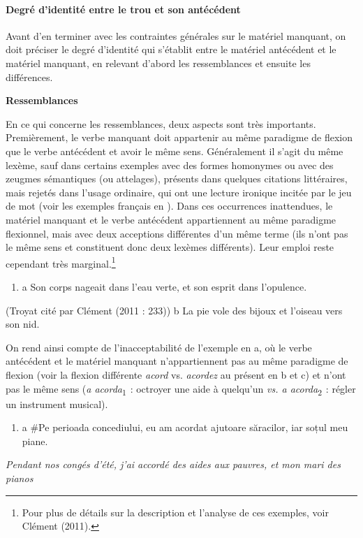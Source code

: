 \paragraph[Degré d'identité entre le trou et son antécédent]{Degré d'identité entre le trou et son antécédent}
Avant d'en terminer avec les contraintes générales sur le matériel manquant, on doit préciser le degré d'identité qui s'établit entre le matériel antécédent et le matériel manquant, en relevant d'abord les ressemblances et ensuite les différences. 

\textbf{Ressemblances}~

En ce qui concerne les ressemblances, deux aspects sont très importants. Premièrement, le verbe manquant doit appartenir au même paradigme de flexion que le verbe antécédent et avoir le même sens. Généralement il s'agit du même lexème, sauf dans certains exemples avec des formes homonymes ou avec des zeugmes sémantiques (ou attelages), présents dans quelques citations littéraires, mais rejetés dans l'usage ordinaire, qui ont une lecture ironique incitée par le jeu de mot (voir les exemples français en ). Dans ces occurrences inattendues, le matériel manquant et le verbe antécédent appartiennent au même paradigme flexionnel, mais avec deux acceptions différentes d'un même terme (ils n'ont pas le même sens et constituent donc deux lexèmes différents). Leur emploi reste cependant très marginal.\footnote{Pour plus de détails sur la description et l'analyse de ces exemples, voir Clément (2011).} 


\begin{enumerate}
\item \label{bkm:Ref302302078}a   Son corps nageait dans l'eau verte, et son esprit dans l'opulence.


\end{enumerate}
                 (Troyat cité par Clément (2011 : 233))   b  La pie vole des bijoux et l'oiseau vers son nid.

On rend ainsi compte de l'inacceptabilité de l'exemple en a, où le verbe antécédent et le matériel manquant n'appartiennent pas au même paradigme de flexion (voir la flexion différente \textit{acord} vs. \textit{acordez} au présent en b et c) et n'ont pas le même sens (\textit{a acorda}\textsubscript{1~}: octroyer une aide à quelqu'un \textit{vs. a acorda}\textsubscript{2~}: régler un instrument musical). 


\begin{enumerate}
\item \label{bkm:Ref299532241}a  \#Pe perioada concediului, eu am acordat ajutoare săracilor, iar soțul meu piane.


\end{enumerate}
{\itshape
Pendant nos congés d'été, j'ai accordé des aides aux pauvres, et mon mari des pianos} 

